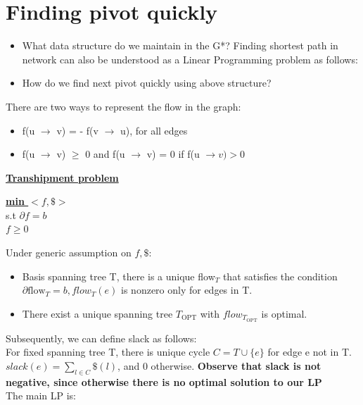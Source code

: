 \documentclass{article}
\begin{document}
\section{Finding pivot quickly}
\begin{itemize}
\item What data structure do we maintain in the G*?
Finding shortest path in network can also be understood as a Linear Programming problem as follows:

\item How do we find next pivot quickly using above structure?
\end{itemize}

There are two ways to represent the flow in the graph:
\begin{itemize}
\item f(u $\rightarrow$ v) = - f(v $\rightarrow$ u), for all edges
\item f(u $\rightarrow$ v) $\geq$ 0 and f(u $\rightarrow$ v) = 0 if f(u $\rightarrow v) > 0$
\end{itemize}

\textbf{\underline{Transhipment problem}}

\begin{center}
\begin{algorithm}
\textbf{\underline{min $<f, \$>$}} \\
  s.t  $\partial f = b$ \\ \qquad
       $f \geq 0$
\end{algorithm}
\end{center}

Under generic assumption on $f, \$$:
\begin{itemize}
\item Basis spanning tree T, there is a unique flow$_T$ that satisfies the condition $\partial \text{flow}_T = b, flow_T (e)$ is nonzero only for edges in T.
\item There exist a unique spanning tree $T_{\text{OPT}}$ with $flow_{T_\text{OPT}}$ is optimal.
\end{itemize}

Subsequently, we can define slack as follows: \\
For fixed spanning tree T, there is unique cycle $C = T \cup \{e\}$ for edge e not in T. $slack(e) = \sum_{l \in C} \$(l)$, and 0 otherwise.
\textbf{Observe that slack is not negative, since otherwise there is no optimal solution to our LP} \\
The main LP is:\\
\end{document}
